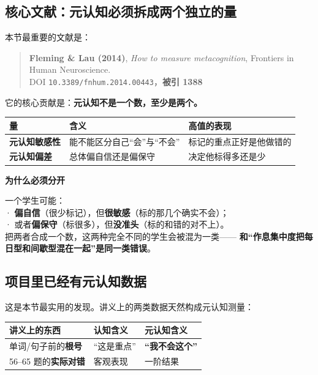 \documentclass[UTF8,a4paper,11pt]{ctexart}
\newenvironment{explainbox}[1]
{\begin{center}\begin{minipage}{0.94\textwidth}\colorbox{boxbg}{\parbox{0.92\textwidth}{\textbf{#1}\par\vspace{2pt}}}}
{\end{minipage}\end{center}}
\begin{document}
\subsection{核心文献：元认知必须拆成两个独立的量}

本节最重要的文献是：

\begin{quote}
\textbf{Fleming \& Lau (2014)}, \textit{How to measure metacognition},
Frontiers in Human Neuroscience.\\
DOI \texttt{10.3389/fnhum.2014.00443}，\textbf{被引 1388}
\end{quote}

它的核心贡献是：\textbf{元认知不是一个数，至少是两个。}

\begin{center}
\begin{tabular}{p{3.4cm}p{4.2cm}p{6.2cm}}
\toprule
\textbf{量} & \textbf{含义} & \textbf{高值的表现} \\
\midrule
\textbf{元认知敏感性} & 能不能区分自己“会”与“不会” & 标记的重点正好是他做错的 \\
\textbf{元认知偏差} & 总体偏自信还是偏保守 & 决定他标得多还是少 \\
\bottomrule
\end{tabular}
\end{center}

\begin{explainbox}{为什么必须分开}
一个学生可能：\\
· \textbf{偏自信}（很少标记），但\textbf{很敏感}（标的那几个确实不会）；\\
· 或者\textbf{偏保守}（标很多），但\textbf{没准头}（标的和错的对不上）。\\[4pt]
把两者合成一个数，这两种完全不同的学生会被混为一类——
\textbf{和“作息集中度把每日型和间歇型混在一起”是同一类错误}。
\end{explainbox}

\subsection{项目里已经有元认知数据}

这是本节最实用的发现。讲义上的两类数据天然构成元认知测量：

\begin{center}
\begin{tabular}{p{3.6cm}p{3.4cm}p{6.8cm}}
\toprule
\textbf{讲义上的东西} & \textbf{认知含义} & \textbf{元认知含义} \\
\midrule
单词/句子前的\textbf{根号} & “这是重点” & \textbf{“我不会这个”} \\
56--65 题的\textbf{实际对错} & 客观表现 & 一阶结果 \\
\bottomrule
\end{tabular}
\end{center}
\end{document}
